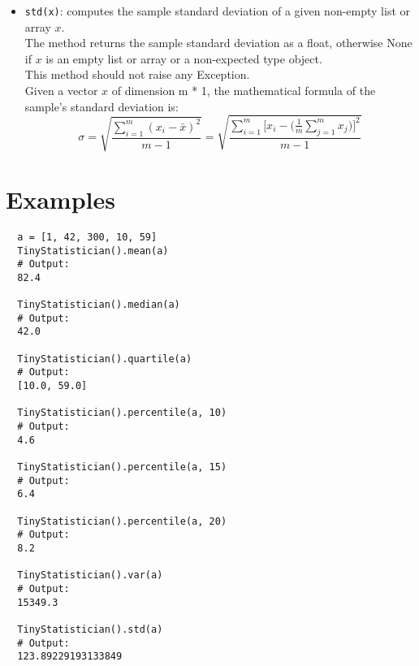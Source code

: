 \begin{itemize}
  \item \texttt{std(x)}: computes the sample standard deviation of a given non-empty list or array $x$.\\
        The method returns the sample standard deviation as a float,
        otherwise None if $x$ is an empty list or array or a non-expected type object.\\
        This method should not raise any Exception.\\
        \newline
        Given a vector $x$ of dimension m * 1, the mathematical formula of the sample's standard deviation is:
        $$
        \sigma = \sqrt{\frac{\sum_{i = 1}^{m}{(x_i - \bar{x})^2}}{m - 1}} = \sqrt{\frac{\sum_{i = 1}^{m}{[x_i - (\frac{1}{m}\sum_{j = 1}^{m}{x_j}})]^2}{m - 1}}
        $$
\end{itemize}

\section*{Examples}

\begin{verbatim}  
  a = [1, 42, 300, 10, 59]
  TinyStatistician().mean(a)
  # Output:
  82.4

  TinyStatistician().median(a)
  # Output:
  42.0

  TinyStatistician().quartile(a)
  # Output:
  [10.0, 59.0]

  TinyStatistician().percentile(a, 10)
  # Output:
  4.6

  TinyStatistician().percentile(a, 15)
  # Output:
  6.4

  TinyStatistician().percentile(a, 20)
  # Output:
  8.2

  TinyStatistician().var(a)
  # Output:
  15349.3

  TinyStatistician().std(a)
  # Output:
  123.89229193133849
\end{verbatim}

